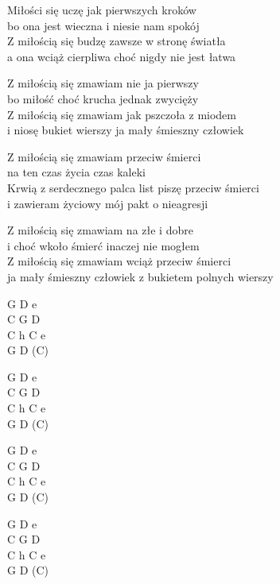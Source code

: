 \begin{text}
    Miłości się uczę jak pierwszych kroków\\
    bo ona jest wieczna i niesie nam spokój\\
    Z miłością się budzę zawsze w stronę światła\\
    a ona wciąż cierpliwa choć nigdy nie jest łatwa

    Z miłością się zmawiam nie ja pierwszy\\
    bo miłość choć krucha jednak zwycięży\\
    Z miłością się zmawiam jak pszczoła z miodem\\
    i niosę bukiet wierszy ja mały śmieszny człowiek

    Z miłością się zmawiam przeciw śmierci\\
    na ten czas życia czas kaleki\\
    Krwią z serdecznego palca list piszę przeciw śmierci\\
    i zawieram życiowy mój pakt o nieagresji

    Z miłością się zmawiam na złe i dobre\\
    i choć wkoło śmierć inaczej nie mogłem\\
    Z miłością się zmawiam wciąż przeciw śmierci\\
    ja mały śmieszny człowiek z bukietem polnych wierszy
\end{text}
\begin{chord}
    G D e\\
    C G D\\
    C h C e\\
    G D (C)

    G D e\\
    C G D\\
    C h C e\\
    G D (C)

    G D e\\
    C G D\\
    C h C e\\
    G D (C)

    G D e\\
    C G D\\
    C h C e\\
    G D (C)
\end{chord}